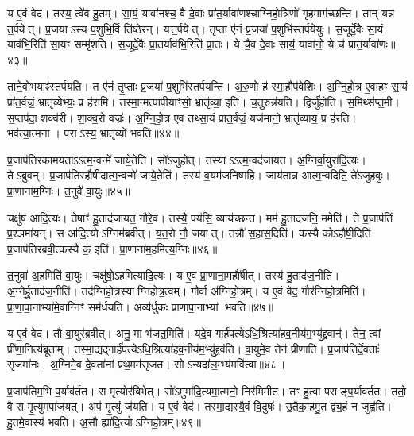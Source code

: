 य ए॒वं वेद॑।
तस्य॒ त्वे॑व हु॒तम्।
सा॒यं॒ यावा॑नश्च॒ वै दे॒वाः प्रा॑त॒र्यावा॑णश्चाग्निहो॒त्रिणो॑ गृ॒हमाग॑च्छन्ति।
तान् यन्न त॒र्पयेत्।
प्र॒जयाऽस्य प॒शुभि॒र्वि ति॑ष्ठेरन्।
यत्त॒र्पयेत्।
तृ॒प्ता ए॑नं प्र॒जया॑ प॒शुभि॑स्तर्पयेयुः।
स॒जूर्दे॒वैः सा॒यं याव॑भि॒रिति॑ सा॒यꣳ सम्मृ॑शति।
स॒जूर्दे॒वैः प्रा॒तर्याव॑भि॒रिति॑ प्रा॒तः।
ये चै॒व दे॒वाः सा॑यं॒ यावा॑नो॒ ये च॑ प्रात॒र्यावा॑णः॥४३॥

ताने॒वोभयाꣴ॑स्तर्पयति।
त ए॑नं तृ॒प्ताः प्र॒जया॑ प॒शुभि॑स्तर्प\-यन्ति।
अ॒रु॒णो ह॑ स्मा॒हौप॑वेशिः।
अ॒ग्नि॒हो॒त्र ए॒वाहꣳ सा॒यं प्रा॑त॒र्वज्रं॒ भ्रातृ॑व्येभ्यः॒ प्र ह॑रामि।
तस्मा॒न्मत्पापी॑याꣳसो॒ भ्रातृ॑व्या॒ इति॑।
च॒तुरुन्न॑यति।
द्विर्जु॑होति।
स॒मिथ्स॑प्त॒मी।
स॒प्तप॑दा॒ शक्व॑री।
शा॒क्व॒रो वज्रः॑।
अ॒ग्नि॒हो॒त्र ए॒व तथ्सा॒यं प्रा॑त॒र्वज्रं॒ यज॑मानो॒ भ्रातृ॑व्याय॒ प्र ह॑रति।
भव॑त्या॒त्मना।
पराऽस्य॒ भ्रातृ॑व्यो भवति॥४४॥

प्र॒जाप॑तिरकामयता\-ऽऽत्म॒न्वन्मे॑ जाये॒तेति॑।
सो॑ऽजुहोत्।
तस्या\-ऽऽत्म॒न्वद॑जायत।
अ॒ग्निर्वा॒युरा॑दि॒त्यः।
तेऽब्रुवन्।
प्र॒जाप॑तिरहौषीदात्म॒न्वन्मे॑ जाये॒तेति॑।
तस्य॑ व॒यम॑जनिष्महि।
जाय॑तान्न आत्म॒न्वदिति॒ ते॑\-ऽजुहवुः।
प्रा॒णाना॑म॒ग्निः।
त॒नुवै॑ वा॒युः॥४५॥

चक्षु॑ष आदि॒त्यः।
तेषाꣳ॑ हु॒ताद॑जायत॒ गौरे॒व।
तस्यै॒ पय॑सि॒ व्याय॑च्छन्त।
मम॑ हु॒ताद॑जनि॒ ममेति॑।
ते प्र॒जाप॑तिं प्र॒श्ञमा॑यन्।
स आ॑दि॒त्यो\-ऽग्निम॑ब्रवीत्।
य॒त॒रो नौ॒ जयात्।
तन्नौ॑ स॒हास॒दिति॑।
कस्यै कोऽहौ॑षी॒दिति॑ प्र॒जाप॑तिरब्रवी॒त्कस्यै क॒ इति॑।
प्रा॒णाना॑म॒हमित्य॒ग्निः॥४६॥

त॒नुवा॑ अ॒हमिति॑ वा॒युः।
चक्षु॑षो॒\-ऽहमित्या॑दि॒त्यः।
य ए॒व प्रा॒णाना॒महौ॑षीत्।
तस्य॑ हु॒ताद॑ज॒नीति॑।
अ॒ग्नेर्\mbox{}हु॒ताद॑ज॒नीति॑।
तद॑ग्निहो॒त्रस्याग्निहोत्र॒त्वम्।
गौर्वा अ॑ग्निहो॒त्रम्।
य ए॒वं वेद॒ गौर॑ग्निहो॒त्रमिति॑।
प्रा॒णा॒पा॒नाभ्या॑मे॒वाग्निꣳ सम॑र्धयति।
अव्य॑र्धुकः प्राणापा॒नाभ्यां भवति॥४७॥

य ए॒वं वेद॑।
तौ वा॒युर॑ब्रवीत्।
अनु॒ मा भ॑जत॒मिति॑।
यदे॒व गार्\mbox{}ह॑पत्ये\-ऽधि॒श्रित्या॑हव॒नीय॑म॒भ्यु॑द्द्रवान्॑।
तेन॒ त्वां प्री॑णा॒नित्य॑ब्रूताम्।
तस्मा॒द्यद्गार्\mbox{}ह॑पत्ये\-ऽधि॒श्रित्या॑हव॒नीय॑\-म॒भ्यु॑द्द्रव॑ति।
वा॒युमे॒व तेन॑ प्रीणाति।
प्र॒जाप॑तिर्दे॒वताः᳚ सृ॒जमा॑नः।
अ॒ग्निमे॒व दे॒वता॑नां प्रथ॒मम॑सृजत।
सोऽन्यदा॑\-ल॒म्भ्य॑मवि॑त्वा॥४८॥

प्र॒जाप॑तिम॒भि प॒र्याव॑र्तत।
स मृ॒त्योर॑बिभेत्।
सो॑ऽमुमा॑दि॒त्य\-मा॒त्मनो॒ निर॑मिमीत।
तꣳ हु॒त्वा पराङ्प॒र्याव॑र्तत।
ततो॒ वै स मृ॒त्युमपा॑जयत्।
अप॑ मृ॒त्युं ज॑यति।
य ए॒वं वेद॑।
तस्मा॒द्यस्यै॒वं वि॒दुषः॑।
उ॒तैका॒हमु॒त द्व्य॒हं न जुह्व॑ति।
हु॒तमे॒वास्य॑ भवति।
अ॒सौ ह्या॑दि॒त्यो\-ऽग्निहो॒त्रम्॥४९॥\anuvakamend[त॒नुवै॑ वा॒युर॒ग्निर्भ॑व॒त्यवि॑त्वा भव॒त्येकं॑ च]

